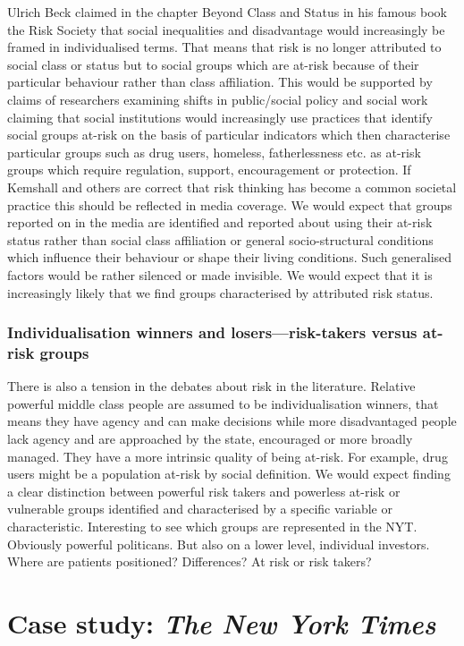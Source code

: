 Ulrich Beck claimed in the chapter Beyond Class and Status in his famous book the Risk Society that social inequalities and disadvantage would increasingly be framed in individualised terms. That means that risk is no longer attributed to social class or status but to social groups which are at-risk because of their particular behaviour rather than class affiliation. 
This would be supported by claims of researchers examining shifts in public\slash social policy and social work claiming that social institutions would increasingly use practices that identify social groups at-risk on the basis of particular indicators which then characterise particular groups such as drug users, homeless, fatherlessness etc. as at-risk groups which require regulation, support, encouragement or protection. If Kemshall and others are correct that risk thinking has become a common societal practice this should be reflected in media coverage.
We would expect that groups reported on in the media are identified and reported about using their at-risk status rather than social class affiliation or general socio-structural conditions which influence their behaviour or shape their living conditions. Such generalised factors would be rather silenced or made invisible. We would expect that it is increasingly likely that we find groups characterised by attributed risk status.

\subsubsection*{Individualisation winners and losers---risk-takers versus at-risk groups}
There is also a tension in the debates about risk in the literature. Relative powerful middle class people are assumed to be individualisation winners, that means they have agency and can make decisions while more disadvantaged people lack agency and are approached by the state, encouraged or more broadly managed. They have a more intrinsic quality of being at-risk. For example, drug users might be a population at-risk by social definition. We would expect finding a clear distinction between powerful risk takers and powerless at-risk or vulnerable groups identified and characterised by a specific variable or characteristic.
Interesting to see which groups are represented in the NYT. Obviously powerful politicans. But also on a lower level, individual investors. Where are patients positioned? Differences? At risk or risk takers?

\section{Case study: \emph{The New York Times}}


